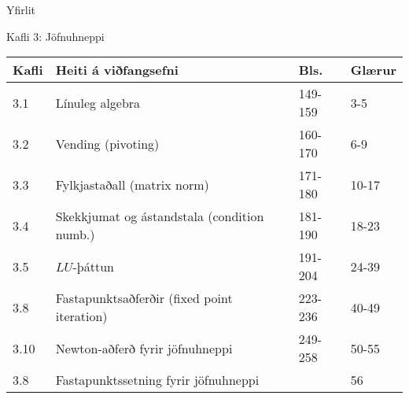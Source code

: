 \date{2., 4.~og 9.~apríl 2014}



\begin{frame}
	\maketitle
\end{frame}

\begin{frame}{Yfirlit}
\begin{block}{Kafli 3: Jöfnuhneppi}
\begin{center}
\begin{tabular}{|l|l|l|l|}\hline
Kafli &Heiti á viðfangsefni &Bls. & Glærur\\
\hline
3.1 & Línuleg algebra & 149-159 & 3-5\\
3.2 & Vending (pivoting) & 160-170 & 6-9\\
3.3 & Fylkjastaðall (matrix norm) & 171-180 & 10-17\\
3.4 & Skekkjumat og ástandstala (condition numb.) & 181-190 & 18-23\\
3.5 & $LU$-þáttun & 191-204 & 24-39\\
3.8 & Fastapunktsaðferðir (fixed point iteration)& 223-236 & 40-49\\
3.10 & Newton-aðferð fyrir jöfnuhneppi &  249-258 & 50-55\\
3.8 & Fastapunktssetning fyrir jöfnuhneppi & & 56\\

\hline
\end{tabular}
\end{center}

\end{block}
\end{frame}

